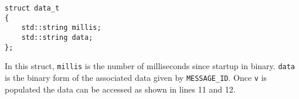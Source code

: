 \begin{lstlisting}[caption=Struct used to store each datapoint,label=code:data_t]
struct data_t
{
	std::string millis;
	std::string data;
};
\end{lstlisting}

In this struct, \texttt{millis} is the number of milliseconds since startup in binary.
\texttt{data} is the binary form of the associated data given by \texttt{MESSAGE\_ID}.
Once \texttt{v} is populated the data can be accessed as shown in lines 11 and 12.
